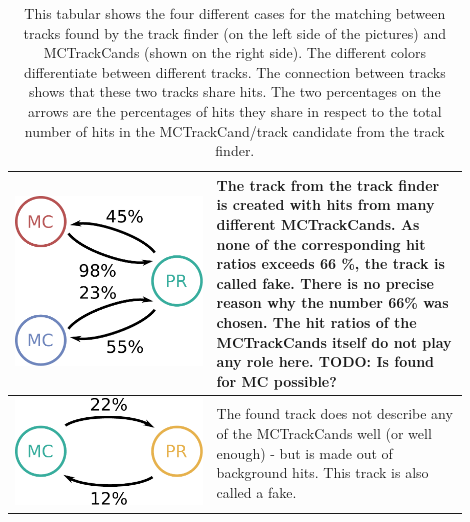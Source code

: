 \begin{table}
\begin{tabular}{m{0.4\linewidth}m{0.5\linewidth}}
    \centering \includegraphics[width=0.8\linewidth]{figures/theory/fom_fake.pdf} & The track from the track finder is created with hits from many different MCTrackCands. As none of the corresponding hit ratios exceeds 66 \%, the track is called fake. There is no precise reason why the number 66\% was chosen. The hit ratios of the MCTrackCands itself do not play any role here. TODO: Is found for MC possible? \\  \midrule
    \centering \includegraphics[width=0.8\linewidth]{figures/theory/fom_background.pdf} & The found track does not describe any of the MCTrackCands well (or well enough) - but is made out of background hits. This track is also called a fake. \\ \bottomrule
  \end{tabular}
  \caption[Matching routine for compiling the FOM.]{This tabular shows the four different cases for the matching between tracks found by the track finder (on the left side of the pictures) and MCTrackCands (shown on the right side). The different colors differentiate between different tracks. The connection between tracks shows that these two tracks share hits. The two percentages on the arrows are the percentages of hits they share in respect to the total number of hits in the MCTrackCand/track candidate from the track finder.}
  \label{tab-mc-track-finder}
\end{table}


